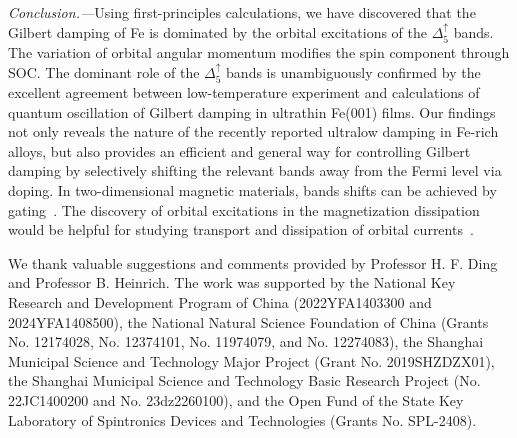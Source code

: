 \documentclass[prl,aps,twocolumn,showpacs,citeautoscript,reprint,superscriptaddress]{revtex4-1}
\begin{document}
{\it\color{red}Conclusion.---}Using first-principles calculations, we have discovered that the Gilbert damping of Fe is dominated by the orbital excitations of the $\Delta_5^\uparrow$ bands. The variation of orbital angular momentum modifies the spin component through SOC. The dominant role of the  $\Delta_5^\uparrow$ bands is unambiguously confirmed by the excellent agreement between low-temperature experiment and calculations of quantum oscillation of Gilbert damping in ultrathin Fe(001) films. Our findings not only reveals the nature of the recently reported ultralow damping in Fe-rich alloys, but also provides an efficient and general way for controlling Gilbert damping by selectively shifting the relevant bands away from the Fermi level via doping. In two-dimensional magnetic materials, bands shifts can be achieved by gating~\cite{Burch:Nat18,Gong:Sci19,Yang:prb22}. The discovery of orbital excitations in the magnetization dissipation would be helpful for studying transport and dissipation of orbital currents~\cite{Ding:prl22,Choi:nat23,Seifert:natnano23,Lyalin:prl23,Sala:prl23,Sohn:prl24,Rang:prb24}. 
	
\acknowledgements
We thank valuable suggestions and comments provided by Professor H. F. Ding and Professor B. Heinrich. The work was supported by the National Key Research and Development Program of China (2022YFA1403300 and 2024YFA1408500), the National Natural Science Foundation of China (Grants No. 12174028, No. 12374101, No. 11974079, and No. 12274083), the Shanghai Municipal Science and Technology Major Project (Grant No. 2019SHZDZX01), the Shanghai Municipal Science and Technology Basic Research Project (No. 22JC1400200 and No. 23dz2260100), and the Open Fund of the State Key Laboratory of Spintronics Devices and Technologies (Grants No. SPL-2408).
	
\end{document}
